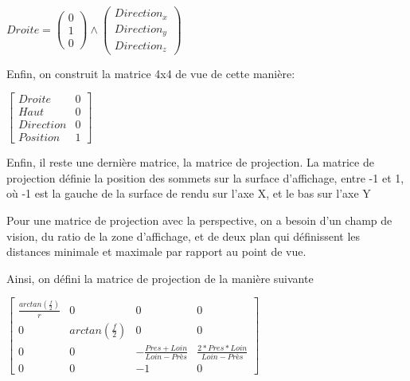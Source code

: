 \documentclass[11pt, a4paper, titlepage]{article}
\begin{document}
\begin{math}
  Droite =
  \begin{pmatrix}
    0 \\
    1 \\
    0
  \end{pmatrix}
  \wedge %
  \begin{pmatrix}
    Direction_x \\
    Direction_y \\
    Direction_z
  \end{pmatrix}
\end{math}

Enfin, on construit la matrice 4x4 de vue de cette manière:

\begin{math}
  \begin{bmatrix}
    Droite    & 0 \\
    Haut      & 0 \\
    Direction & 0 \\
    Position  & 1
  \end{bmatrix}
\end{math}

Enfin, il reste une dernière matrice, la matrice de projection.  La
matrice de projection définie la position des sommets sur la surface
d'affichage, entre -1 et 1, où -1 est la gauche de la surface de rendu
sur l'axe X, et le bas sur l'axe Y

Pour une matrice de projection avec la perspective, on a besoin d'un
champ de vision, du ratio de la zone d'affichage, et de deux plan qui
définissent les distances minimale et maximale par rapport au point de
vue.

Ainsi, on défini la matrice de projection de la manière suivante

\begin{math}
  \begin{bmatrix}
    \frac{arctan(\frac{f}{2})}{r} & 0                  & 0                                 & 0                                   \\
    0                             &arctan(\frac{f}{2}) & 0                                 & 0                                   \\
    0                             & 0                  & - \frac{Pres + Loin}{Loin - Près} & \frac{2 * Pres * Loin}{Loin - Près} \\
    0                             & 0                  & - 1                               & 0
  \end{bmatrix}
\end{math}
\end{document}
